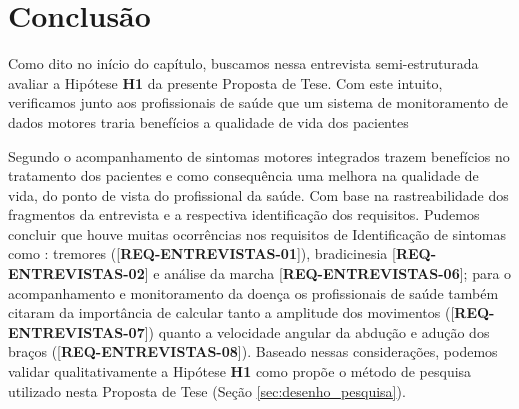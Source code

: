 \section{Conclusão}
Como dito no início do capítulo, buscamos nessa entrevista semi-estruturada avaliar a Hipótese \textbf{H1} da presente Proposta de Tese. Com este intuito, verificamos junto aos profissionais de saúde que um sistema de monitoramento de dados motores traria benefícios a qualidade de vida dos pacientes

Segundo o acompanhamento de sintomas motores integrados trazem benefícios no tratamento dos pacientes e como consequência uma melhora na qualidade de vida, do ponto de vista do profissional da saúde. Com base na rastreabilidade dos fragmentos da entrevista e a respectiva identificação dos requisitos. Pudemos concluir que houve muitas ocorrências nos requisitos de Identificação de sintomas como : tremores ([\textbf{REQ-ENTREVISTAS-01}]), bradicinesia [\textbf{REQ-ENTREVISTAS-02}] e análise da marcha [\textbf{REQ-ENTREVISTAS-06}]; para o acompanhamento e monitoramento da doença os profissionais de saúde também citaram da importância de calcular tanto a amplitude dos movimentos ([\textbf{REQ-ENTREVISTAS-07}]) quanto a velocidade angular da abdução e adução dos braços ([\textbf{REQ-ENTREVISTAS-08}]). Baseado nessas considerações, podemos validar qualitativamente a Hipótese \textbf{H1} como propõe o método de pesquisa utilizado nesta Proposta de Tese (Seção \ref{sec:desenho_pesquisa}).
